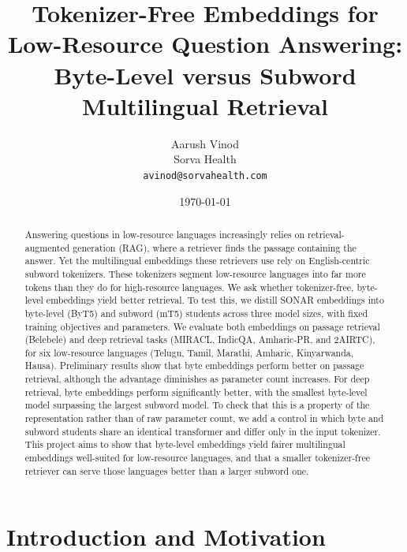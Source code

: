\documentclass[11pt]{article}
\title{\textbf{Tokenizer-Free Embeddings for Low-Resource Question Answering:\\[2pt]
Byte-Level versus Subword Multilingual Retrieval}}
\author{Aarush Vinod\\ \small Sorva Health \\ \small \texttt{avinod@sorvahealth.com}}
\date{\today}
\begin{document}
\maketitle

\begin{abstract}
\noindent
Answering questions in low-resource languages increasingly relies on retrieval-augmented
generation (RAG), where a retriever finds the passage containing the answer. Yet the multilingual
embeddings these retrievers use rely on English-centric subword tokenizers. These tokenizers segment
low-resource languages into far more tokens than they do for high-resource languages. We ask whether
tokenizer-free, byte-level embeddings yield better retrieval. To test this, we distill SONAR
embeddings into byte-level (ByT5) and subword (mT5) students across three model sizes, with fixed
training objectives and parameters. We evaluate both embeddings on passage retrieval (Belebele) and
deep retrieval tasks (MIRACL, IndicQA, Amharic-PR, and 2AIRTC), for six low-resource languages
(Telugu, Tamil, Marathi, Amharic, Kinyarwanda, Hausa). Preliminary results show that byte embeddings
perform better on passage retrieval, although the advantage diminishes as parameter count increases.
For deep retrieval, byte embeddings perform significantly better, with the smallest byte-level model
surpassing the largest subword model. To check that this is a property of the representation rather
than of raw parameter count, we add a control in which byte and subword students share an identical
transformer and differ only in the input tokenizer. This project aims to show that byte-level
embeddings yield fairer multilingual embeddings well-suited for low-resource languages, and that a
smaller tokenizer-free retriever can serve those languages better than a larger subword one.
\end{abstract}

\section{Introduction and Motivation}
\label{sec:intro}
\end{document}
